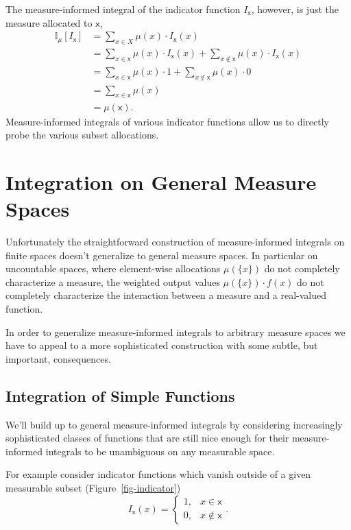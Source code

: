 \documentclass[
  letterpaper,
  DIV=11,
  numbers=noendperiod]{scrartcl}
\begin{document}
The measure-informed integral of the indicator function
\(I_{\mathsf{x}}\), however, is just the measure allocated to
\(\mathsf{x}\), \begin{align*}
\mathbb{I}_{\mu}[I_{\mathsf{x}}]
&= \sum_{x \in X} \mu(x) \cdot I_{\mathsf{x}} (x)
\\
&= \sum_{x \in \mathsf{x}} \mu(x) \cdot I_{\mathsf{x}} (x)
  + \sum_{x \notin \mathsf{x}} \mu(x) \cdot I_{\mathsf{x}} (x)
\\
&=  \sum_{x \in \mathsf{x}} \mu(x) \cdot 1
  + \sum_{x \notin \mathsf{x}} \mu(x) \cdot 0
\\
&=  \sum_{x \in \mathsf{x}} \mu(x)
\\
&= \mu( \mathsf{x} ).
\end{align*} Measure-informed integrals of various indicator functions
allow us to directly probe the various subset allocations.

\hypertarget{integration-on-general-measure-spaces}{%
\section{Integration on General Measure
Spaces}\label{integration-on-general-measure-spaces}}

Unfortunately the straightforward construction of measure-informed
integrals on finite spaces doesn't generalize to general measure spaces.
In particular on uncountable spaces, where element-wise allocations
\(\mu( \{x\} )\) do not completely characterize a measure, the weighted
output values \(\mu( \{ x \} ) \cdot f(x)\) do not completely
characterize the interaction between a measure and a real-valued
function.

In order to generalize measure-informed integrals to arbitrary measure
spaces we have to appeal to a more sophisticated construction with some
subtle, but important, consequences.

\hypertarget{integration-of-simple-functions}{%
\subsection{Integration of Simple
Functions}\label{integration-of-simple-functions}}

We'll build up to general measure-informed integrals by considering
increasingly sophisticated classes of functions that are still nice
enough for their measure-informed integrals to be unambiguous on any
measurable space.

For example consider indicator functions which vanish outside of a given
measurable subset (Figure~\ref{fig-indicator}) \[
I_{\mathsf{x}} (x) =
\left\{
\begin{array}{rr}
1, & x \in \mathsf{x} \\
0, & x \notin \mathsf{x}
\end{array}
\right. .
\]
\end{document}
